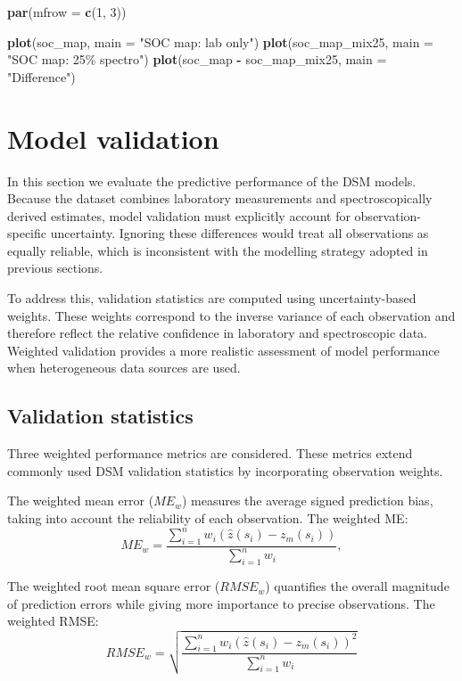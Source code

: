 \documentclass[
  10pt,
  b5paper,
  oneside]{book}
\newenvironment{Shaded}{\begin{snugshade}}{\end{snugshade}}
\newcommand{\AttributeTok}[1]{\textcolor[rgb]{0.13,0.29,0.53}{#1}}
\newcommand{\DecValTok}[1]{\textcolor[rgb]{0.00,0.00,0.81}{#1}}
\newcommand{\FunctionTok}[1]{\textcolor[rgb]{0.13,0.29,0.53}{\textbf{#1}}}
\newcommand{\NormalTok}[1]{#1}
\newcommand{\SpecialCharTok}[1]{\textcolor[rgb]{0.81,0.36,0.00}{\textbf{#1}}}
\newcommand{\StringTok}[1]{\textcolor[rgb]{0.31,0.60,0.02}{#1}}
\begin{document}
\begin{Shaded}
\begin{Highlighting}[]
\FunctionTok{par}\NormalTok{(}\AttributeTok{mfrow =} \FunctionTok{c}\NormalTok{(}\DecValTok{1}\NormalTok{, }\DecValTok{3}\NormalTok{))}

\FunctionTok{plot}\NormalTok{(soc\_map, }\AttributeTok{main =} \StringTok{"SOC map: lab only"}\NormalTok{)}
\FunctionTok{plot}\NormalTok{(soc\_map\_mix25, }\AttributeTok{main =} \StringTok{"SOC map: 25\% spectro"}\NormalTok{)}
\FunctionTok{plot}\NormalTok{(soc\_map }\SpecialCharTok{{-}}\NormalTok{ soc\_map\_mix25, }\AttributeTok{main =} \StringTok{"Difference"}\NormalTok{)}
\end{Highlighting}
\end{Shaded}

\section{Model validation}\label{model-validation}

In this section we evaluate the predictive performance of the DSM models. Because the dataset combines laboratory measurements and spectroscopically derived estimates, model validation must explicitly account for observation-specific uncertainty. Ignoring these differences would treat all observations as equally reliable, which is inconsistent with the modelling strategy adopted in previous sections.

To address this, validation statistics are computed using uncertainty-based weights. These weights correspond to the inverse variance of each observation and therefore reflect the relative confidence in laboratory and spectroscopic data. Weighted validation provides a more realistic assessment of model performance when heterogeneous data sources are used.

\subsection{Validation statistics}\label{validation-statistics}

Three weighted performance metrics are considered. These metrics extend commonly used DSM validation statistics by incorporating observation weights.

The weighted mean error (\(ME_w\)) measures the average signed prediction bias, taking into account the reliability of each observation.
The weighted ME:
\[
ME_w =
\frac{\sum_{i=1}^{n} w_i \left( \hat{z}(s_i) - z_m(s_i) \right)}
{\sum_{i=1}^{n} w_i},
\]

The weighted root mean square error (\(RMSE_w\)) quantifies the overall magnitude of prediction errors while giving more importance to precise observations.
The weighted RMSE:
\[
RMSE_w =
\sqrt{
\frac{
\sum_{i=1}^{n} w_i \left( \hat{z}(s_i) - z_m(s_i) \right)^2
}{
\sum_{i=1}^{n} w_i
}
}
\]
\end{document}
